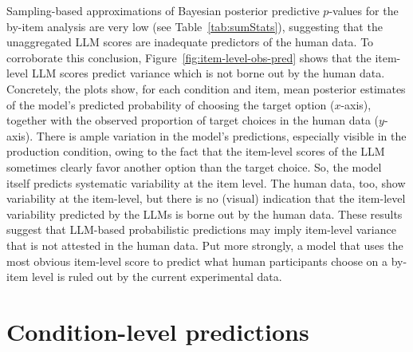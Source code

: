 \documentclass[fleqn]{article}
\begin{document}
Sampling-based approximations of Bayesian posterior predictive $p$-values for the by-item analysis are very low (see Table~\ref{tab:sumStats}), suggesting that the unaggregated LLM scores are inadequate predictors of the human data.
To corroborate this conclusion, Figure~\ref{fig:item-level-obs-pred} shows that the item-level LLM scores predict variance which is not borne out by the human data.
Concretely, the plots show, for each condition and item, mean posterior estimates of the model's predicted probability of choosing the target option ($x$-axis), together with the observed proportion of target choices in the human data ($y$-axis).
There is ample variation in the model's predictions, especially visible in the production condition, owing to the fact that the item-level scores of the LLM sometimes clearly favor another option than the target choice.
So, the model itself predicts systematic variability at the item level.
The human data, too, show variability at the item-level, but there is no (visual) indication that the item-level variability predicted by the LLMs is borne out by the human data.
These results suggest that LLM-based probabilistic predictions may imply item-level variance that is not attested in the human data.
Put more strongly, a model that uses the most obvious item-level score to predict what human participants choose on a by-item level is ruled out by the current experimental data.



\section{Condition-level predictions}
\label{llm-predictions-for-reference-games}

\end{document}
